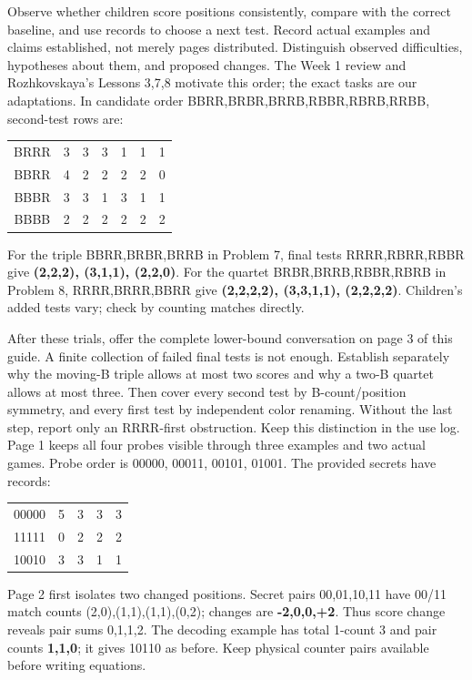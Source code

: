 \documentclass[11pt]{article}
\begin{document}
Observe whether children score positions consistently, compare with the correct baseline, and use records to choose a next test. Record actual examples and claims established, not merely pages distributed. Distinguish observed difficulties, hypotheses about them, and proposed changes. The Week 1 review and Rozhkovskaya's Lessons 3,7,8 motivate this order; the exact tasks are our adaptations.
\newpage
{}
In candidate order BBRR,BRBR,BRRB,RBBR,RBRB,RRBB, second-test rows are:
\begin{center}\renewcommand{\arraystretch}{1.3}\begin{tabular}{c|rrrrrr}BRRR&3&3&3&1&1&1\\BBRR&4&2&2&2&2&0\\BBBR&3&3&1&3&1&1\\BBBB&2&2&2&2&2&2\end{tabular}\end{center}
For the triple BBRR,BRBR,BRRB in Problem 7, final tests RRRR,RBRR,RBBR give \textbf{(2,2,2), (3,1,1), (2,2,0)}. For the quartet BRBR,BRRB,RBBR,RBRB in Problem 8, RRRR,BRRR,BBRR give \textbf{(2,2,2,2), (3,3,1,1), (2,2,2,2)}. Children's added tests vary; check by counting matches directly.

After these trials, offer the complete lower-bound conversation on page 3 of this guide. A finite collection of failed final tests is not enough. Establish separately why the moving-B triple allows at most two scores and why a two-B quartet allows at most three. Then cover every second test by B-count/position symmetry, and every first test by independent color renaming. Without the last step, report only an RRRR-first obstruction. Keep this distinction in the use log.
Page 1 keeps all four probes visible through three examples and two actual games. Probe order is 00000, 00011, 00101, 01001. The provided secrets have records:
\begin{center}\renewcommand{\arraystretch}{1.4}\begin{tabular}{c|rrrr}00000&5&3&3&3\\11111&0&2&2&2\\10010&3&3&1&1\end{tabular}\end{center}
Page 2 first isolates two changed positions. Secret pairs 00,01,10,11 have 00/11 match counts (2,0),(1,1),(1,1),(0,2); changes are \textbf{-2,0,0,+2}. Thus score change reveals pair sums 0,1,1,2. The decoding example has total 1-count 3 and pair counts \textbf{1,1,0}; it gives 10110 as before. Keep physical counter pairs available before writing equations.
\end{document}
